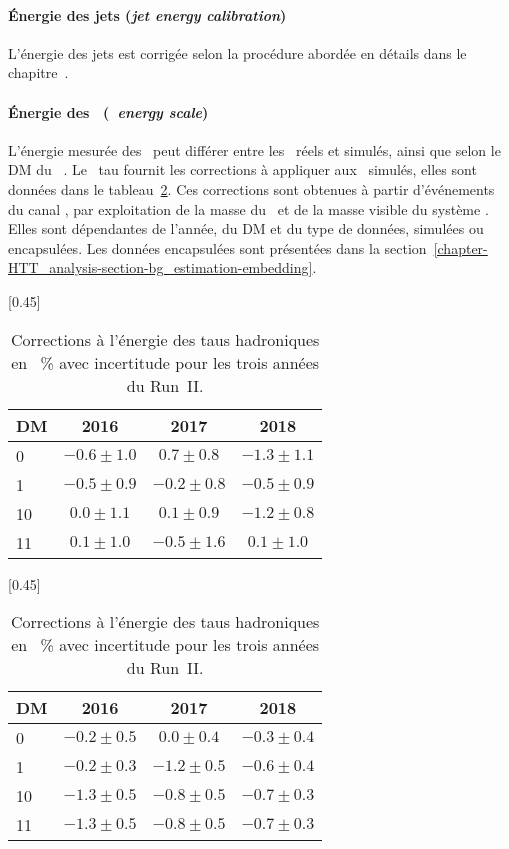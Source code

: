 \paragraph{Énergie des jets (\emph{jet energy calibration})}
L'énergie des jets est corrigée selon la procédure abordée en détails dans le chapitre~.
\paragraph{Énergie des \tauh\ (\emph{\tauh\ energy scale})}
L'énergie mesurée des \tauh\ peut différer entre les \tauh\ réels et simulés, ainsi que selon le DM du \tauh~\cite{TauPOG}.
Le \POG\ tau fournit les corrections à appliquer aux \tauh\ simulés, elles sont données dans le tableau~\ref{tab-chapter-HTT_analysis-section-corrections-tauES}.
Ces corrections sont obtenues à partir d'événements du canal \mu\tauh, par exploitation de la masse du \tauh\ et de la masse visible du système \mu\tauh.
Elles sont dépendantes de l'année, du DM et du type de données, simulées ou encapsulées.
Les données encapsulées sont présentées dans la section~\ref{chapter-HTT_analysis-section-bg_estimation-embedding}.
\begin{table}[h]
\centering
{}[0.45\textwidth]
{\begin{tabular}{lccc}
\toprule
DM & 2016 & 2017 & 2018\\
\midrule
0 & $\num{-0.6}\pm\num{1.0}$ & $\num{0.7}\pm\num{0.8}$ & $\num{-1.3}\pm\num{1.1}$ \\
1 & $\num{-0.5}\pm\num{0.9}$ & $\num{-0.2}\pm\num{0.8}$ & $\num{-0.5}\pm\num{0.9}$ \\
10 & $\num{0.0}\pm\num{1.1}$ & $\num{0.1}\pm\num{0.9}$ & $\num{-1.2}\pm\num{0.8}$ \\
11 & $\num{0.1}\pm\num{1.0}$ & $\num{-0.5}\pm\num{1.6}$ & $\num{0.1}\pm\num{1.0}$ \\
\bottomrule
\end{tabular}}
\qquad
{}[0.45\textwidth]
{\begin{tabular}{lccc}
\toprule
DM & 2016 & 2017 & 2018\\
\midrule
0 & $\num{-0.2}\pm\num{0.5}$ & $\num{0.0}\pm\num{0.4}$ & $\num{-0.3}\pm\num{0.4}$ \\
1 & $\num{-0.2}\pm\num{0.3}$ & $\num{-1.2}\pm\num{0.5}$ & $\num{-0.6}\pm\num{0.4}$ \\
10 & $\num{-1.3}\pm\num{0.5}$ & $\num{-0.8}\pm\num{0.5}$ & $\num{-0.7}\pm\num{0.3}$ \\
11 & $\num{-1.3}\pm\num{0.5}$ & $\num{-0.8}\pm\num{0.5}$ & $\num{-0.7}\pm\num{0.3}$ \\
\bottomrule
\end{tabular}}
\caption[Corrections à l'énergie des taus hadroniques.]{Corrections à l'énergie des taus hadroniques en \SI{}{\%} avec incertitude pour les trois années du Run~II.}
\label{tab-chapter-HTT_analysis-section-corrections-tauES}
\end{table}
